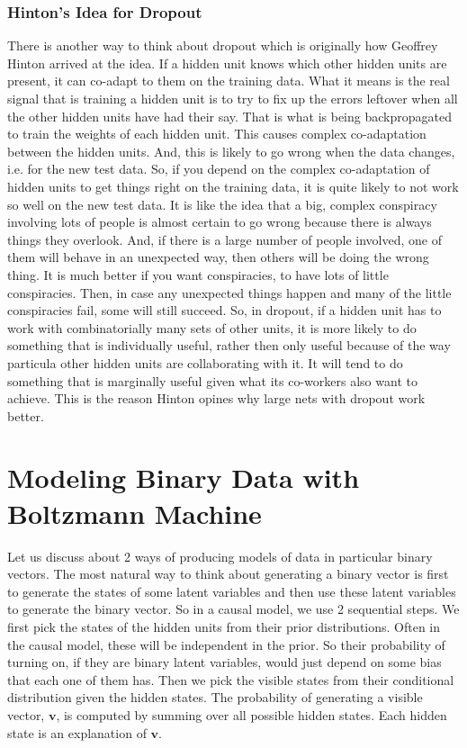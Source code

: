 \documentclass{article}
\begin{document}
\subsubsection{Hinton's Idea for Dropout}
There is another way to think about dropout which is originally how Geoffrey Hinton arrived at the idea. If a hidden unit knows which other hidden units are present, it can co-adapt to them on the training data. What it means is the real signal that is training a hidden unit is to try to fix up the errors leftover when all the other hidden units have had their say. That is what is being backpropagated to train the weights of each hidden unit. This causes complex co-adaptation between the hidden units. And, this is likely to go wrong when the data changes, i.e. for the new test data. So, if you depend on the complex co-adaptation of hidden units to get things right on the training data, it is quite likely to not work so well on the new test data. It is like the idea that a big, complex conspiracy involving lots of people is almost certain to go wrong because there is always things they overlook. And, if there is a large number of people involved, one of them will behave in an unexpected way, then others will be doing the wrong thing. It is much better if you want conspiracies, to have lots of little conspiracies. Then, in case any unexpected things happen and many of the little conspiracies fail, some will still succeed. So, in dropout, if a hidden unit has to work with combinatorially many sets of other units, it is more likely to do something that is individually useful, rather then only useful because of the way particula other hidden units are collaborating with it. It will tend to do something that is marginally useful given what its co-workers also want to achieve. This is the reason Hinton opines why large nets with dropout work better.  

\section{Modeling Binary Data with Boltzmann Machine}
Let us discuss about 2 ways of producing models of data in particular binary vectors. The most natural way to think about generating a binary vector is first to generate the states of some latent variables and then use these latent variables to generate the binary vector. So in a causal model, we use 2 sequential steps. We first pick the states of the hidden units from their prior distributions. Often in the causal model, these will be independent in the prior. So their probability of turning on, if they are binary latent variables, would just depend on some bias that each one of them has. Then we pick the visible states from their conditional distribution given the hidden states. The probability of generating a visible vector, $\mathbf{v}$, is computed by summing over all possible hidden states. Each hidden state is an explanation of $\mathbf{v}$. 
\end{document}

